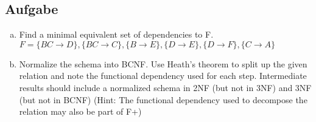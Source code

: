 \documentclass[11pt,a4paper,DIV=9]{scrartcl}
\newcounter{temp}
\newcommand{\aufgabe}[1]{
  \setcounter{temp}{\value{subsection}}
  \setcounter{subsection}{#1}
  \addtocounter{subsection}{-1}
  \subsection{Aufgabe}
  \setcounter{subsection}{\value{temp}}
}
\begin{document}
\aufgabe{4}
  \begin{enumerate}[a.]
    \item Find a minimal equivalent set of dependencies to F. \\
    $ F = \{{BC \rightarrow D}\}, \{{BC \rightarrow C}\}, \{{B \rightarrow E}\}, \{{D \rightarrow E}\}, \{{D \rightarrow F}\}, \{{C \rightarrow A}\} $
    \item Normalize the schema into BCNF. Use Heath's theorem to split up the given relation and note the functional dependency used for each step. Intermediate results should include a normalized schema in 2NF (but not in 3NF) and 3NF (but not in BCNF) (Hint: The functional dependency used to decompose the relation may also be part of F+)
  \end{enumerate}
\end{document}
